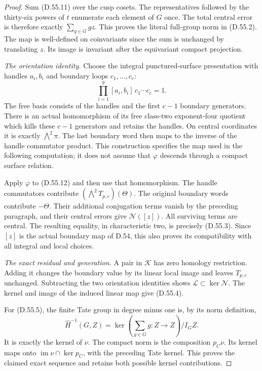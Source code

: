 \begin{proof}
Sum (D.55.11) over the cusp cosets.
The representatives followed by the
thirty-six powers of \(t\) enumerate
each element of \(G\) once. The total
central error is therefore exactly
\(\sum_{g\in G}gz\). This proves the
literal full-group norm in (D.55.2).
The map is well-defined on
coinvariants since the sum is
unchanged by translating \(z\).
Its image is invariant after the
equivariant compact projection.

\emph{The orientation identity.}
Choose the integral punctured-surface
presentation with handles \(a_i,b_i\)
and boundary loops \(c_1,\ldots,c_c\):
\[
          \prod_{i=1}^{g}[a_i,b_i]\,
                    c_1\cdots c_c=1 .
 \tag{D.55.12}
\]
The free basis consists of the
handles and the first \(c-1\)
boundary generators. There is an
actual homomorphism of its free
class-two exponent-four quotient
which kills these \(c-1\) generators
and retains the handles. On central
coordinates it is exactly
\(\bigwedge^2\pi\).
The last boundary word then maps
to the inverse of the handle
commutator product. This construction
specifies the map used in the
following computation; it does not
assume that \(\varphi\) descends
through a compact surface relation.

Apply \(\varphi\) to (D.55.12) and
then use that homomorphism.
The handle commutators contribute
\((\bigwedge^2T_{p,c})(\Theta)\).
The original boundary words contribute
\(-\Theta\).
Their additional conjugation terms
vanish by the preceding paragraph,
and their central errors give
\(\mathcal N([z])\).
All surviving terms are central.
The resulting equality, in
characteristic two, is precisely
(D.55.3). Since \([z]\) is the
actual boundary map of D.54, this
also proves its compatibility with
all integral and local choices.

\emph{The exact residual and generation.}
A pair in \(\mathcal K\) has zero
homology restriction. Adding it
changes the boundary value by its
linear local image and leaves
\(T_{p,c}\) unchanged. Subtracting
the two orientation identities shows
\(\mathcal L\subset\ker\mathcal N\).
The kernel and image of the induced
linear map give (D.55.4).

For (D.55.5), the finite Tate group
in degree minus one is, by its
norm definition,
\[
 \widehat H^{-1}(G,Z)
   =\ker\!\left(\sum_{g\in G}g:Z\to Z\right)/I_GZ .
 \tag{D.55.13}
\]
It is exactly the kernel of \(\nu\).
The compact norm is the composition
\(p_C\nu\). Its kernel maps onto
\(\operatorname{im}\nu\cap\ker p_C\),
with the preceding Tate kernel.
This proves the claimed exact
sequence and retains both possible
kernel contributions.


\end{proof}
